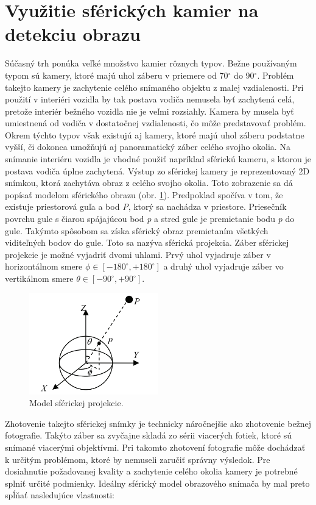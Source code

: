 \documentclass[slovak,master,dept460,male,cpp,cpdeclaration]{diploma}
\begin{document}
\section{Využitie sférických kamier na detekciu obrazu}
\label{sec:Spherical cameras}
Súčasný trh ponúka veľké množstvo kamier rôznych typov. Bežne používaným typom sú kamery, ktoré majú  uhol záberu v priemere  od 70$^\circ$ do 90$^\circ$. Problém takejto kamery je zachytenie celého snímaného objektu z malej vzdialenosti. Pri použití v interiéri vozidla by tak  postava vodiča nemusela byť zachytená celá, pretože interiér bežného vozidla nie je veľmi rozsiahly. Kamera by musela byť umiestnená od vodiča v dostatočnej vzdialenosti, čo môže predstavovať problém. Okrem týchto typov však existujú aj kamery, ktoré majú uhol záberu podstatne vyšší, či dokonca umožňujú aj panoramatický záber celého svojho okolia. Na snímanie interiéru vozidla je vhodné použiť napríklad sférickú kameru, s ktorou je postava vodiča úplne zachytená.
Výstup zo sférickej kamery je reprezentovaný 2D snímkou, ktorá  zachytáva obraz z celého svojho okolia. Toto zobrazenie sa dá popísať  modelom sférického obrazu (obr. \ref{fig:sphericalModel}). Predpoklad spočíva v tom, že existuje priestorová guľa a bod \textit{P}, ktorý sa nachádza v priestore. Priesečník povrchu gule s čiarou spájajúcou bod \textit{p} a stred gule je premietanie bodu \textit{p} do gule. Takýmto spôsobom sa získa sférický obraz premietaním všetkých viditeľných bodov do gule. Toto sa nazýva sférická projekcia. Záber sférickej projekcie  je možné vyjadriť dvomi uhlami. Prvý uhol vyjadruje záber v horizontálnom smere $ \phi \in [-180^\circ , +180^\circ ]$ a druhý uhol vyjadruje záber vo vertikálnom smere  $\theta \in [-90^\circ , +90^\circ ]$.
\begin{figure}[H]
	\centering
	\includegraphics[width=0.5\textwidth]{Figures/sphericalModel.png}
	\caption{Model sférickej projekcie.\cite{li2006full}}
	\label{fig:sphericalModel}
\end{figure}
Zhotovenie takejto sférickej snímky je technicky  náročnejšie ako zhotovenie bežnej fotografie. Takýto záber sa zvyčajne skladá zo sérii viacerých fotiek, ktoré sú snímané viacerými objektívmi. Pri takomto zhotovení fotografie môže dochádzať k určitým problémom, ktoré by nemuseli zaručiť správny výsledok. Pre dosiahnutie požadovanej kvality a zachytenie  celého okolia kamery je potrebné splniť určité podmienky. Ideálny sférický model obrazového snímača by mal preto spĺňať nasledujúce vlastnosti:
\end{document}
